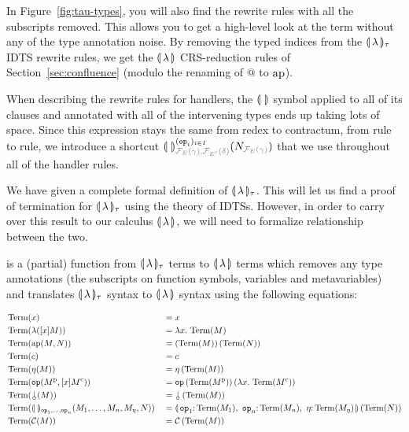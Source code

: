 In Figure~\ref{fig:tau-types}, you will also find the rewrite rules with
all the subscripts removed. This allows you to get a high-level look at the
term without any of the type annotation noise. By removing the typed
indices from the $\llparenthesis \, \lambda \, \rrparenthesis_\tau$ IDTS rewrite rules, we get the
$\llparenthesis \, \lambda \, \rrparenthesis$ CRS-reduction rules of Section~\ref{sec:confluence}
(modulo the renaming of $@$ to $\operatorname{ap}$).

When describing the rewrite rules for handlers, the $\llparenthesis \,  \, \rrparenthesis$ symbol
applied to all of its clauses and annotated with all of the intervening
types ends up taking lots of space. Since this expression stays the same
from redex to contractum, from rule to rule, we introduce a shortcut
$\banana{}^{(\op{op}_i)_{i \in
    I}}_{\typehint{\FF_E(\gamma),\FF_{E'}(\delta)}}(N_{\typehint{\FF_E(\gamma)}})$
that we use throughout all of the handler rules.

We have given a complete formal definition of $\llparenthesis \, \lambda \, \rrparenthesis_\tau$. This
will let us find a proof of termination for $\llparenthesis \, \lambda \, \rrparenthesis_\tau$ using
the theory of IDTSs. However, in order to carry over this result to our
calculus $\llparenthesis \, \lambda \, \rrparenthesis$, we will need to formalize relationship between
the two.

\begin{definition}
   is a (partial) function from $\llparenthesis \, \lambda \, \rrparenthesis_\tau$ terms
  to $\llparenthesis \, \lambda \, \rrparenthesis$ terms which removes any type annotations (the
  subscripts on function symbols, variables and metavariables) and
  translates $\llparenthesis \, \lambda \, \rrparenthesis_\tau$ syntax to $\llparenthesis \, \lambda \, \rrparenthesis$ syntax
  using the following equations:
  
  \begin{align*}
    & \Term(x) &&= x \\
    & \Term(\lambda([x] M)) &&= \lam{x}{\Term(M)} \\
    & \Term(\aps(M, N)) &&= \ap{(\Term(M))}{(\Term(N))} \\
    & \Term(c) &&= c \\
    & \Term(\eta(M)) &&= \etaE{(\Term(M))} \\
    & \Term(\op{op}(M^{\mathrm{p}}, [x] M^{\mathrm{c}})) &&= \app{\op{op}}{(\Term(M^{\mathrm{p}}))}{(\lam{x}{\Term(M^{\mathrm{c}})})} \\
    & \Term(\cherry(M)) &&= \ap{\cherry}{(\Term(M))} \\
    & \Term(\banana{}_{\op{op}_1, \ldots, \op{op}_n}(M_1, \ldots, M_n, M_\eta, N)) &&= \ap{\banana{\onto{\op{op}_1}{\Term(M_1)},\ \onto{\op{op}_n}{\Term(M_n)},\ \onto{\eta}{\Term(M_\eta)}}}{(\Term(N))} \\
    & \Term(\CC(M)) &&= \ap{\CC}{(\Term(M))}
  \end{align*}
\end{definition}

